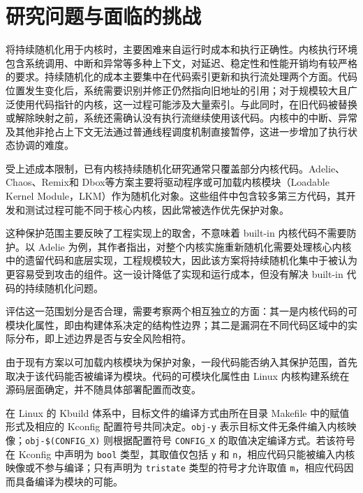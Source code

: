 \section{研究问题与面临的挑战}

将持续随机化用于内核时，主要困难来自运行时成本和执行正确性。内核执行环境包含系统调用、中断和异常等多种上下文，对延迟、稳定性和性能开销均有较严格的要求。持续随机化的成本主要集中在代码索引更新和执行流处理两个方面。代码位置发生变化后，系统需要识别并修正仍然指向旧地址的引用；对于规模较大且广泛使用代码指针的内核，这一过程可能涉及大量索引。与此同时，在旧代码被替换或解除映射之前，系统还需确认没有执行流继续使用该代码。内核中的中断、异常及其他非抢占上下文无法通过普通线程调度机制直接暂停，这进一步增加了执行状态协调的难度。

受上述成本限制，已有内核持续随机化研究通常只覆盖部分内核代码。Adelie\citep{nikolaev2022adelie}、Chaos\citep{chang2024chaos}、Remix\citep{chen2016remix}和 Dbox\citep{li2024dbox}等方案主要将驱动程序或可加载内核模块（Loadable Kernel Module，LKM）作为随机化对象。这些组件中包含较多第三方代码，其开发和测试过程可能不同于核心内核，因此常被选作优先保护对象。

这种保护范围主要反映了工程实现上的取舍，不意味着 built-in 内核代码不需要防护。以 Adelie 为例，其作者指出，对整个内核实施重新随机化需要处理核心内核中的遗留代码和底层实现，工程规模较大，因此该方案将持续随机化集中于被认为更容易受到攻击的组件\citep{nikolaev2022adelie}。这一设计降低了实现和运行成本，但没有解决 built-in 代码的持续随机化问题。

评估这一范围划分是否合理，需要考察两个相互独立的方面：其一是内核代码的可模块化属性，即由构建体系决定的结构性边界；其二是漏洞在不同代码区域中的实际分布，即上述边界是否与安全风险相符。

由于现有方案以可加载内核模块为保护对象，一段代码能否纳入其保护范围，首先取决于该代码能否被编译为模块。代码的可模块化属性由 Linux 内核构建系统在源码层面确定，并不随具体部署配置而改变。

在 Linux 的 Kbuild 体系中，目标文件的编译方式由所在目录 Makefile 中的赋值形式及相应的 Kconfig 配置符号共同决定。\lstinline[breaklines=false]@obj-y@ 表示目标文件无条件编入内核映像；\lstinline[breaklines=false]@obj-$(CONFIG_X)@ 则根据配置符号 \lstinline[breaklines=false]@CONFIG_X@ 的取值决定编译方式。若该符号在 Kconfig 中声明为 \lstinline[breaklines=false]@bool@ 类型，其取值仅包括 \lstinline[breaklines=false]@y@ 和 \lstinline[breaklines=false]@n@，相应代码只能被编入内核映像或不参与编译；只有声明为 \lstinline[breaklines=false]@tristate@ 类型的符号才允许取值 \lstinline[breaklines=false]@m@，相应代码因而具备编译为模块的可能。

